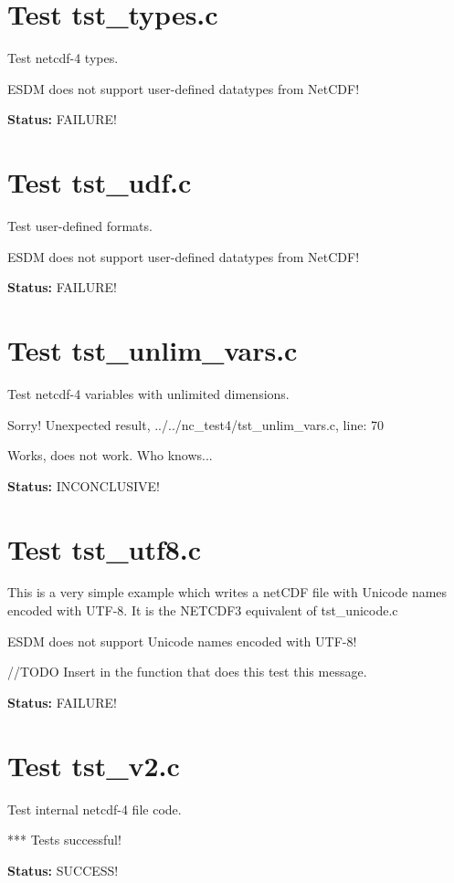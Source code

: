 \section{Test tst\_types.c}

Test netcdf-4 types.

ESDM does not support user-defined datatypes from NetCDF!

{\bf \large Status: } FAILURE!

\section{Test tst\_udf.c}

Test user-defined formats.

ESDM does not support user-defined datatypes from NetCDF!

{\bf \large Status: } FAILURE!

\section{Test tst\_unlim\_vars.c}

Test netcdf-4 variables with unlimited dimensions.

Sorry! Unexpected result, ../../nc\_test4/tst\_unlim\_vars.c, line: 70

Works, does not work. Who knows...

{\bf \large Status: } INCONCLUSIVE!

\section{Test tst\_utf8.c}

This is a very simple example which writes a netCDF file with Unicode names encoded with UTF-8. It is the NETCDF3 equivalent of tst\_unicode.c

ESDM does not support Unicode names encoded with UTF-8!

//TODO Insert in the function that does this test this message.

{\bf \large Status: } FAILURE!

\section{Test tst\_v2.c}

Test internal netcdf-4 file code.

*** Tests successful!

{\bf \large Status: } SUCCESS!

